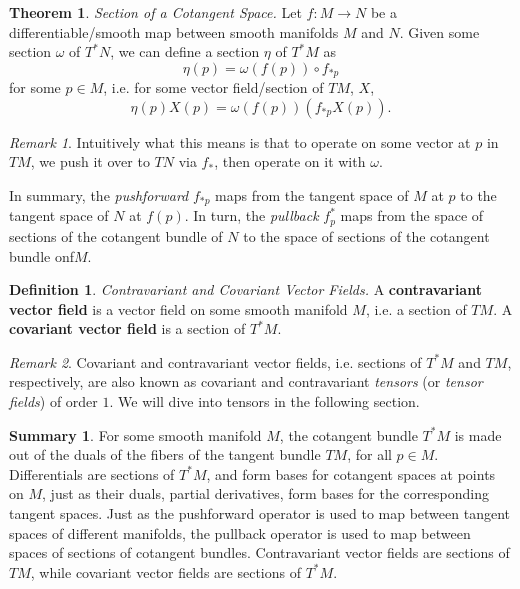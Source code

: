 \documentclass[10pt,landscape]{article}
\theoremstyle{definition}
\newtheorem{definition}{Definition}[section]
\theoremstyle{theorem}
\newtheorem{theorem}{Theorem}[section]
\theoremstyle{summary}
\newtheorem*{summary}{Summary}
\theoremstyle{remark}
\newtheorem*{remark}{Remark}
\begin{document}
\begin{multicols*}{3}
\theoremstyle{theorem}
\begin{theorem}{\textit{Section of a Cotangent Space.}}
    Let $f:M\rightarrow N$ be a differentiable/smooth map between smooth manifolds $M$ and $N$. Given some section $\omega$ of $T^*N$, we can define a section $\eta$ of $T^*M$ as
    \begin{equation}
        \eta(p) = \omega (f(p)) \circ f_{*p}
    \end{equation}
    for some $p\in M$, i.e. for some vector field/section of $TM$, $X$,
    \begin{equation}
        \eta(p)X(p) = \omega(f(p))(f_{*p}X(p)).
    \end{equation}
\end{theorem}

\begin{remark}
    Intuitively what this means is that to operate on some vector at $p$ in $TM$, we push it over to $TN$ via $f_*$, then operate on it with $\omega$. 
    
    In summary, the \textit{pushforward} $f_{*p}$ maps from the tangent space of $M$ at $p$ to the tangent space of $N$ at $f(p)$. In turn, the \textit{pullback} $f_p^*$ maps from the space of sections of the cotangent bundle of $N$ to the space of sections of the cotangent bundle onf$M$.
\end{remark}

\theoremstyle{definition}
\begin{definition}{\textit{Contravariant and Covariant Vector Fields.}}
    A \textbf{contravariant vector field} is a vector field on some smooth manifold $M$, i.e. a section of $TM$. A \textbf{covariant vector field} is a section of $T^*M$.
\end{definition}

\begin{remark}
    Covariant and contravariant vector fields, i.e. sections of $T^*M$ and $TM$, respectively, are also known as covariant and contravariant \textit{tensors} (or \textit{tensor fields}) of order $1$. We will dive into tensors in the following section.
\end{remark}

\begin{summary}
    For some smooth manifold $M$, the cotangent bundle $T^*M$ is made out of the duals of the fibers of the tangent bundle $TM$, for all $p\in M$. Differentials are sections of $T^*M$, and form bases for cotangent spaces at points on $M$, just as their duals, partial derivatives, form bases for the corresponding tangent spaces. Just as the pushforward operator is used to map between tangent spaces of different manifolds, the pullback operator is used to map between spaces of sections of cotangent bundles. Contravariant vector fields are sections of $TM$, while covariant vector fields are sections of $T^*M$.
\end{summary}


\end{multicols*}
\end{document}
